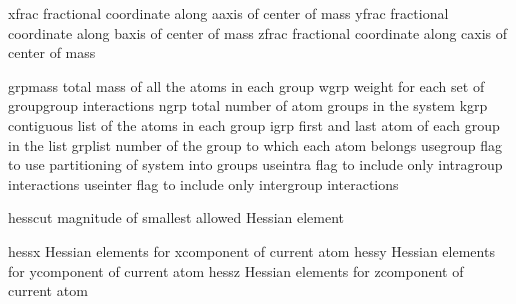 \documentclass[letterpaper,11pt,english]{sphinxmanual}
\begin{document}

\begin{sphinxVerbatim}[commandchars=\\\{\}]
xfrac           fractional coordinate along a\PYGZhy{}axis of center of mass
yfrac           fractional coordinate along b\PYGZhy{}axis of center of mass
zfrac           fractional coordinate along c\PYGZhy{}axis of center of mass
\end{sphinxVerbatim}


\begin{sphinxVerbatim}[commandchars=\\\{\}]
grpmass         total mass of all the atoms in each group
wgrp            weight for each set of group\PYGZhy{}group interactions
ngrp            total number of atom groups in the system
kgrp            contiguous list of the atoms in each group
igrp            first and last atom of each group in the list
grplist         number of the group to which each atom belongs
use\PYGZus{}group       flag to use partitioning of system into groups
use\PYGZus{}intra       flag to include only intragroup interactions
use\PYGZus{}inter       flag to include only intergroup interactions
\end{sphinxVerbatim}


\begin{sphinxVerbatim}[commandchars=\\\{\}]
hesscut         magnitude of smallest allowed Hessian element
\end{sphinxVerbatim}


\begin{sphinxVerbatim}[commandchars=\\\{\}]
hessx           Hessian elements for x\PYGZhy{}component of current atom
hessy           Hessian elements for y\PYGZhy{}component of current atom
hessz           Hessian elements for z\PYGZhy{}component of current atom
\end{sphinxVerbatim}

\end{document}
